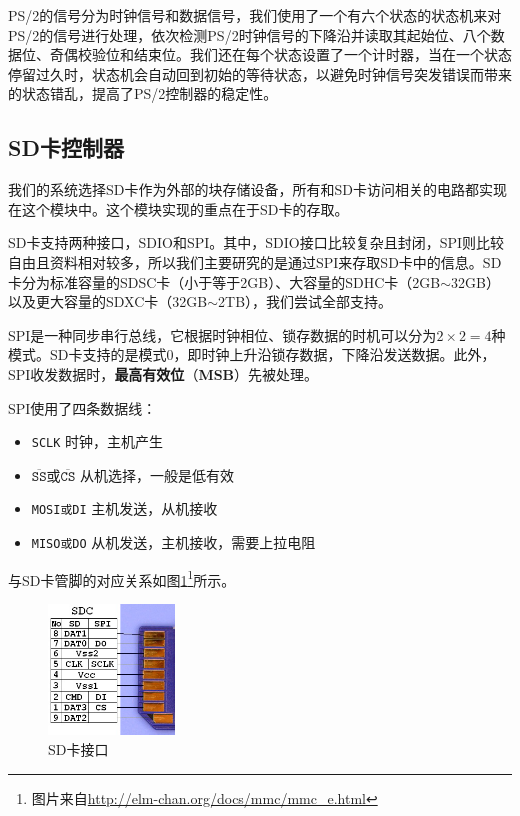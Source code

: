 \documentclass[11pt,utf8]{report}
\begin{document}
	PS/2的信号分为时钟信号和数据信号，我们使用了一个有六个状态的状态机来对PS/2的信号进行处理，依次检测PS/2时钟信号的下降沿并读取其起始位、八个数据位、奇偶校验位和结束位。我们还在每个状态设置了一个计时器，当在一个状态停留过久时，状态机会自动回到初始的等待状态，以避免时钟信号突发错误而带来的状态错乱，提高了PS/2控制器的稳定性。

\subsection{SD卡控制器}
	\par 我们的系统选择SD卡作为外部的块存储设备，所有和SD卡访问相关的电路都实现在这个模块中。这个模块实现的重点在于SD卡的存取。
	
	\par SD卡支持两种接口，SDIO和SPI。其中，SDIO接口比较复杂且封闭，SPI则比较自由且资料相对较多，所以我们主要研究的是通过SPI来存取SD卡中的信息。SD卡分为标准容量的SDSC卡（小于等于2GB）、大容量的SDHC卡（2GB$\sim$32GB）以及更大容量的SDXC卡（32GB$\sim$2TB），我们尝试全部支持。
	
	\par SPI是一种同步串行总线，它根据时钟相位、锁存数据的时机可以分为$2 \times 2=4$种模式。SD卡支持的是模式0，即时钟上升沿锁存数据，下降沿发送数据。此外，SPI收发数据时，\textbf{最高有效位}（\textbf{MSB}）先被处理。
	\par SPI使用了四条数据线：
	\begin{itemize}
		\item \texttt{SCLK} 时钟，主机产生
		\item \texttt{$\mathtt{\overline{SS}}\mbox{或}\mathtt{\overline{CS}}$} 从机选择，一般是低有效
		\item \texttt{MOSI或DI} 主机发送，从机接收
		\item \texttt{MISO或DO} 从机发送，主机接收，需要上拉电阻
	\end{itemize}
	
	与SD卡管脚的对应关系如图\ref{sd}\footnote{图片来自\url{http://elm-chan.org/docs/mmc/mmc\_e.html}}所示。
	
	\begin{figure}[h!]
		\centering
		\includegraphics[width=0.3\textwidth]{sd}
		\caption{SD卡接口}
		\label{sd}
	\end{figure}
	
\end{document}
